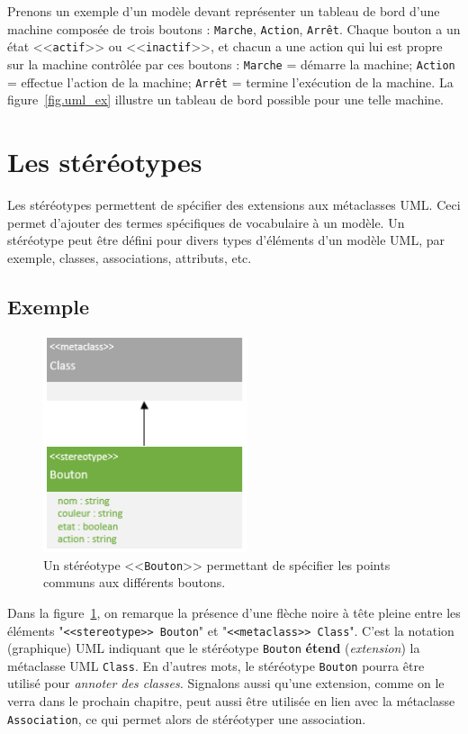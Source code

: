 Prenons un exemple d'un mod\`ele devant représenter un tableau de bord d'une machine composée de trois boutons : \texttt{Marche}, \texttt{Action}, \texttt{Arrêt}.
Chaque bouton a un état <<\texttt{actif}>> ou <<\texttt{inactif}>>, et
chacun a une action qui lui est propre sur la machine contr\^ol\'ee par ces boutons : \texttt{Marche} = démarre la machine; \texttt{Action} = effectue l'action de la machine; \texttt{Arrêt} = termine l'ex\'ecution de la machine.
%
La figure~\ref{fig.uml_ex} illustre un tableau de bord possible pour une telle machine.


\section{Les stéréotypes}
\label{sect.uml.ster}
Les stéréotypes permettent de spécifier des extensions aux métaclasses UML.
Ceci permet d'ajouter des termes spécifiques de vocabulaire à un mod\`ele.
Un stéréotype peut être défini pour divers types d'éléments d'un mod\`ele UML, par exemple, classes, associations, attributs, etc.


\subsection*{Exemple}
%
\begin{figure}
    \begin{center}
    \includegraphics[width=6cm]{10_img/chap4/button.PNG}
    \caption{Un st\'er\'eotype <<\texttt{Bouton}>> permettant de sp\'ecifier les points communs aux diff\'erents boutons.}
    \label{fig.uml_but_definition}
    \end{center}
\end{figure}

Dans la figure~\ref{fig.uml_but_definition}, on remarque la présence d'une flèche noire à tête pleine entre les éléments "\texttt{<<stereotype>> Bouton}" et "\texttt{<<metaclass>>~Class}".
C'est la notation (graphique) UML indiquant que le st\'er\'eotype \texttt{Bouton} \textbf{étend} (\emph{extension}) la métaclasse UML \texttt{Class}.
%
En d'autres mots, le stéréotype \texttt{Bouton} pourra être utilisé pour \emph{annoter des classes.}
%
Signalons aussi qu'une extension, comme on le verra dans le prochain chapitre, peut aussi être utilisée en lien avec la métaclasse \texttt{Association}, ce qui permet alors de stéréotyper une association.

